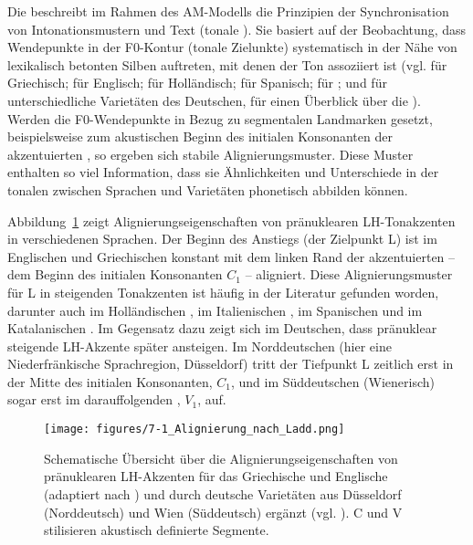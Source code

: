Die  beschreibt im Rahmen des AM-Modells die Prinzipien der Synchronisation von Intonationsmustern und Text (tonale ). Sie basiert auf der Beobachtung, dass Wendepunkte in der F0-Kontur (tonale Zielunkte) systematisch in der Nähe von lexikalisch betonten Silben auftreten, mit denen der Ton assoziiert ist (vgl. \citealt{Arvaniti1998} für Griechisch; \citealt{Ladd1999} für Englisch; \citealt{Ladd2000} für Holländisch; \citealt{Prieto2007b} für Spanisch; \citealt{Dimperio2007} für ; \citealt{Atterer2004} und \citealt{Mücke2008b} für unterschiedliche Varietäten des Deutschen, \citealt{Ladd2008} für einen Überblick über die ). Werden die F0-Wendepunkte in Bezug zu segmentalen Landmarken gesetzt, beispielsweise zum akustischen Beginn des initialen Konsonanten der akzentuierten , so ergeben sich stabile Alignierungsmuster. Diese Muster enthalten so viel Information, dass sie Ähnlichkeiten und Unterschiede in der tonalen  zwischen Sprachen und Varietäten phonetisch abbilden können.

Abbildung~\ref{figure:0701} zeigt Alignierungseigenschaften von pränuklearen LH-Ton\-ak\-zen\-ten in verschiedenen Sprachen. Der Beginn des Anstiegs (der Zielpunkt L) ist im Englischen und Griechischen konstant mit dem linken Rand der akzentuierten  -- dem Beginn des initialen Konsonanten ${C}_{1}$ -- aligniert. Diese Alignierungsmuster für L in steigenden Tonakzenten ist häufig in der Literatur gefunden worden, darunter auch im Holländischen \citep{Ladd2000}, im Italienischen \citep{Dimperio2002}, im Spanischen \citep{Prieto2007b} und im Katalanischen \citep{Prieto2007a}. Im Gegensatz dazu zeigt sich im Deutschen, dass pränuklear steigende LH-Akzente später ansteigen. Im Norddeutschen (hier eine Niederfränkische Sprachregion, Düsseldorf) tritt der Tiefpunkt L zeitlich erst in der Mitte des initialen Konsonanten, ${C}_{1}$, und im Süddeutschen (Wienerisch) sogar erst im darauffolgenden , ${V}_{1}$, auf.

\begin{figure}
	\texttt{[image: figures/7-1\_Alignierung\_nach\_Ladd.png]}
	\caption{Schematische Übersicht über die Alignierungseigenschaften von pränuklearen LH-Akzenten für das Griechische und Englische (adaptiert nach \citealt{Atterer2004}) und durch deutsche Varietäten aus Düsseldorf (Norddeutsch) und Wien (Süddeutsch) ergänzt (vgl. \citealt{Mücke2008b}). C und V stilisieren akustisch definierte Segmente.}
	\label{figure:0701}
\end{figure}

